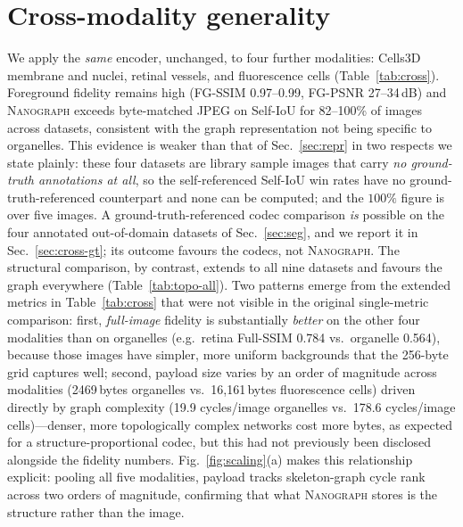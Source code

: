 \documentclass[10pt,a4paper]{article}
\newcommand{\method}{\textnormal{\textsc{Nanograph}}\xspace}
\begin{document}
\section{Cross-modality generality}\label{sec:cross}
We apply the \emph{same} encoder, unchanged, to four further modalities:
Cells3D membrane and nuclei, retinal vessels, and fluorescence cells
(Table~\ref{tab:cross}). Foreground fidelity remains high (FG-SSIM
0.97--0.99, FG-PSNR 27--34\,dB) and \method exceeds byte-matched JPEG on
Self-IoU for 82--100\% of images across datasets, consistent with the graph
representation not being specific to organelles. This evidence is weaker than
that of Sec.~\ref{sec:repr} in two respects we state plainly: these four
datasets are library sample images that carry \emph{no ground-truth
annotations at all}, so the self-referenced Self-IoU win rates have no
ground-truth-referenced counterpart and none can be computed;
and the $100\%$ figure is over five images. A ground-truth-referenced
codec comparison \emph{is} possible on the four annotated out-of-domain
datasets of Sec.~\ref{sec:seg}, and we report it in
Sec.~\ref{sec:cross-gt}; its outcome favours the codecs, not \method. The
structural comparison, by contrast, extends to all nine datasets and favours
the graph everywhere (Table~\ref{tab:topo-all}). Two patterns emerge from the
extended metrics in Table~\ref{tab:cross} that were not visible in the
original single-metric comparison: first, \emph{full-image} fidelity is
substantially \emph{better} on the other four modalities than on organelles
(e.g.\ retina Full-SSIM 0.784 vs.\ organelle 0.564), because those images
have simpler, more uniform backgrounds that the 256-byte grid captures well;
second, payload size varies by an order of magnitude across modalities
(2469\,bytes organelles vs.\ 16{,}161\,bytes fluorescence cells) driven
directly by graph complexity (19.9 cycles/image organelles vs.\ 178.6
cycles/image cells)---denser, more topologically complex networks cost more
bytes, as expected for a structure-proportional codec, but this had not
previously been disclosed alongside the fidelity numbers.
Fig.~\ref{fig:scaling}(a) makes this relationship explicit: pooling all five
modalities, payload tracks skeleton-graph cycle rank across two orders of
magnitude, confirming that what \method stores is the structure rather than
the image.
\end{document}
